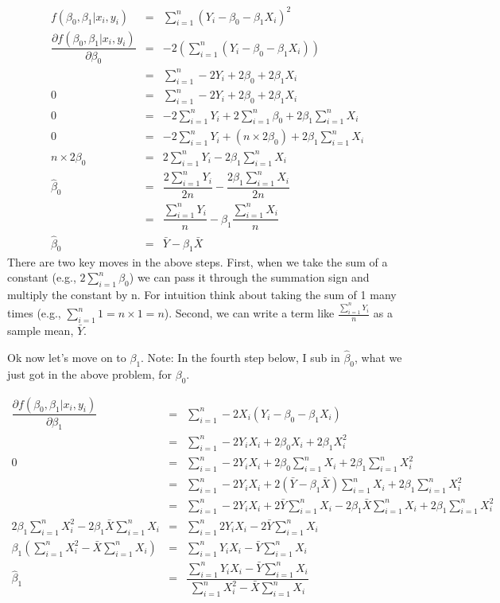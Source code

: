 \documentclass[10pt]{amsart}
\begin{document}
 \begin{eqnarray*}
 f(\beta_0, \beta_1 | x_i, y_i) &=& \sum_{i=1}^n (Y_i - \beta_0 - \beta_1 X_i )^2\\
\dfrac{\partial{ f(\beta_0, \beta_1 | x_i, y_i)}}{\partial \beta_0} &=& -2 (\sum_{i=1}^n (Y_i - \beta_0 - \beta_1 X_i))\\
&=& \sum_{i=1}^n -2Y_i + 2\beta_0 + 2\beta_1 X_i\\
0 &=& \sum_{i=1}^n -2Y_{i} + 2\beta_0 + 2\beta_1 X_i\\
0 &=& -2 \sum_{i=1}^n Y_{i} +  2\sum_{i=1}^n \beta_0 +  2\beta_1 \sum_{i=1}^n X_i\\
0 &=& -2 \sum_{i=1}^n Y_{i} +  (n \times 2\beta_0) +  2\beta_1 \sum_{i=1}^n X_i\\
n \times 2\beta_0 &=& 2 \sum_{i=1}^n Y_i - 2\beta_1 \sum_{i=1}^n X_i\\
\hat \beta_0 &=& \dfrac{2 \sum_{i=1}^n Y_i}{2n} - \dfrac{2\beta_1 \sum_{i=1}^n X_i}{2n}\\
&=&  \dfrac{\sum_{i=1}^n Y_i}{n} - \beta_1\dfrac{ \sum_{i=1}^n X_i}{n}\\
 \hat \beta_0 &=& \bar{Y} - \beta_1 \bar{X}
\end{eqnarray*}
There are two key moves in the above steps. First, when we take the sum of a constant (e.g., $2\sum_{i=1}^n \beta_0$) we can pass it through the summation sign and multiply the constant by n. For intuition think about taking the sum of 1 many times (e.g., $\sum_{i=1}^n 1 = n\times1 = n$). Second, we can write a term like $\frac{\sum_{i=1}^n Y_i}{n}$ as a sample mean, $\bar Y$. 

Ok now let's move on to $\beta_1$. Note: In the fourth step below, I sub in $\hat \beta_0$, what we just got in the above problem, for $\beta_0$. 

\begin{eqnarray*}
\dfrac{\partial{ f(\beta_0, \beta_1 | x_i, y_i)}}{\partial \beta_1} &=& \sum_{i=1}^n -2X_i(Y_i - \beta_0 - \beta_1 X_i) \\
&=&  \sum_{i=1}^n -2Y_iX_i + 2\beta_0X_i + 2\beta_1 X_i^2\\
0 &=&  \sum_{i=1}^n -2Y_iX_i + 2\beta_0 \sum_{i=1}^nX_i + 2\beta_1  \sum_{i=1}^n X_i^2\\
&=&  \sum_{i=1}^n -2Y_iX_i + 2 (\bar{Y} - \beta_1 \bar{X}) \sum_{i=1}^nX_i + 2\beta_1  \sum_{i=1}^n X_i^2\\
&=& \sum_{i=1}^n -2Y_iX_i + 2\bar{Y} \sum_{i=1}^nX_i - 2\beta_1 \bar{X}\sum_{i=1}^nX_i + 2\beta_1  \sum_{i=1}^n X_i^2\\
2\beta_1  \sum_{i=1}^n X_i^2 - 2\beta_1 \bar{X}\sum_{i=1}^nX_i  &=& \sum_{i=1}^n 2Y_iX_i  - 2\bar{Y} \sum_{i=1}^nX_i\\
\beta_1 ( \sum_{i=1}^n X_i^2 - \bar{X}\sum_{i=1}^nX_i ) &=& \sum_{i=1}^n Y_iX_i  - \bar{Y} \sum_{i=1}^nX_i\\
\hat \beta_1 &=& \dfrac{ \sum_{i=1}^n Y_iX_i  - \bar{Y} \sum_{i=1}^nX_i}{ \sum_{i=1}^n X_i^2 - \bar{X}\sum_{i=1}^nX_i}\\
\end{eqnarray*}
\end{document}

